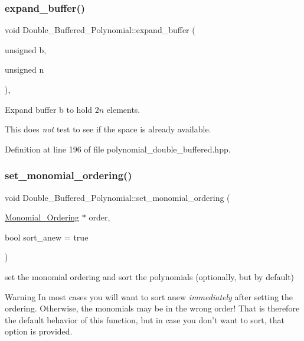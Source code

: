 \subsubsection{\texorpdfstring{expand\+\_\+buffer()}{expand\_buffer()}}
{\footnotesize\ttfamily void Double\+\_\+\+Buffered\+\_\+\+Polynomial\+::expand\+\_\+buffer (\begin{DoxyParamCaption}\item[{unsigned}]{b,  }\item[{unsigned}]{n }\end{DoxyParamCaption})\hspace{0.3cm}{\ttfamily [inline]}, {\ttfamily [protected]}}



Expand buffer {\ttfamily b} to hold $ 2n $ elements. 

This does {\itshape not} test to see if the space is already available. 

Definition at line 196 of file polynomial\+\_\+double\+\_\+buffered.\+hpp.

\mbox{\label{class_double___buffered___polynomial_ae0cb00f5657fcc0c51c5c6e9659b89a3}} 
\subsubsection{\texorpdfstring{set\+\_\+monomial\+\_\+ordering()}{set\_monomial\_ordering()}}
{\footnotesize\ttfamily void Double\+\_\+\+Buffered\+\_\+\+Polynomial\+::set\+\_\+monomial\+\_\+ordering (\begin{DoxyParamCaption}\item[{\hyperlink{class_monomial___ordering}{Monomial\+\_\+\+Ordering} $\ast$}]{order,  }\item[{bool}]{sort\+\_\+anew = {\ttfamily true} }\end{DoxyParamCaption})\hspace{0.3cm}{\ttfamily [virtual]}}



set the monomial ordering and sort the polynomials (optionally, but by default) 

\begin{DoxyWarning}{Warning}
In most cases you will want to sort anew {\itshape immediately} after setting the ordering. Otherwise, the monomials may be in the wrong order! That is therefore the default behavior of this function, but in case you don't want to sort, that option is provided. 
\end{DoxyWarning}


